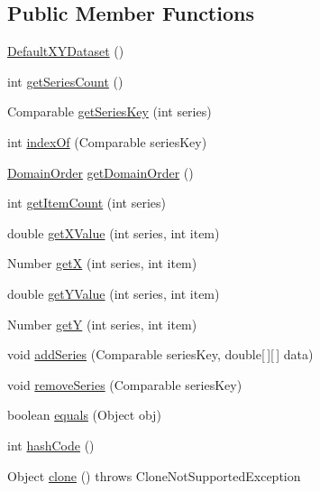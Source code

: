 \subsection*{Public Member Functions}
\begin{DoxyCompactItemize}
\item 
\mbox{\hyperlink{classorg_1_1jfree_1_1data_1_1xy_1_1_default_x_y_dataset_aeb6942f7255b4a3582d83688f1157e79}{Default\+X\+Y\+Dataset}} ()
\item 
int \mbox{\hyperlink{classorg_1_1jfree_1_1data_1_1xy_1_1_default_x_y_dataset_a0e11a4936eb729adf611cb44013abc5b}{get\+Series\+Count}} ()
\item 
Comparable \mbox{\hyperlink{classorg_1_1jfree_1_1data_1_1xy_1_1_default_x_y_dataset_a6dfb403ab13b08ab72e484c32c2583e6}{get\+Series\+Key}} (int series)
\item 
int \mbox{\hyperlink{classorg_1_1jfree_1_1data_1_1xy_1_1_default_x_y_dataset_a436e2b868c431a1d9bc4ce560749334c}{index\+Of}} (Comparable series\+Key)
\item 
\mbox{\hyperlink{classorg_1_1jfree_1_1data_1_1_domain_order}{Domain\+Order}} \mbox{\hyperlink{classorg_1_1jfree_1_1data_1_1xy_1_1_default_x_y_dataset_ae665218f6d5daa96f37e198265f72200}{get\+Domain\+Order}} ()
\item 
int \mbox{\hyperlink{classorg_1_1jfree_1_1data_1_1xy_1_1_default_x_y_dataset_acb92df806d4aa8e3b18283b6dbf05461}{get\+Item\+Count}} (int series)
\item 
double \mbox{\hyperlink{classorg_1_1jfree_1_1data_1_1xy_1_1_default_x_y_dataset_a8b2261dd2265af0d085c4889ae519521}{get\+X\+Value}} (int series, int item)
\item 
Number \mbox{\hyperlink{classorg_1_1jfree_1_1data_1_1xy_1_1_default_x_y_dataset_ab501c39779d3289533248c8c40a18c1d}{getX}} (int series, int item)
\item 
double \mbox{\hyperlink{classorg_1_1jfree_1_1data_1_1xy_1_1_default_x_y_dataset_a2ac3a1e3295eaa3aacb36b210926fbf4}{get\+Y\+Value}} (int series, int item)
\item 
Number \mbox{\hyperlink{classorg_1_1jfree_1_1data_1_1xy_1_1_default_x_y_dataset_a8ad15161967d0f527b5fa885ebc14bc6}{getY}} (int series, int item)
\item 
void \mbox{\hyperlink{classorg_1_1jfree_1_1data_1_1xy_1_1_default_x_y_dataset_ae5b45f2fa36fbb4a123e5f8cc79e9428}{add\+Series}} (Comparable series\+Key, double\mbox{[}$\,$\mbox{]}\mbox{[}$\,$\mbox{]} data)
\item 
void \mbox{\hyperlink{classorg_1_1jfree_1_1data_1_1xy_1_1_default_x_y_dataset_a16d3b763b0b7eafc0dfb41d19dc684c2}{remove\+Series}} (Comparable series\+Key)
\item 
boolean \mbox{\hyperlink{classorg_1_1jfree_1_1data_1_1xy_1_1_default_x_y_dataset_a052652bf9cfccae599debee96b44d9be}{equals}} (Object obj)
\item 
int \mbox{\hyperlink{classorg_1_1jfree_1_1data_1_1xy_1_1_default_x_y_dataset_afa686c5effe2f7eaebccc69e0845a563}{hash\+Code}} ()
\item 
Object \mbox{\hyperlink{classorg_1_1jfree_1_1data_1_1xy_1_1_default_x_y_dataset_a81d3c0d90cd6535b174c5f18d15d830d}{clone}} ()  throws Clone\+Not\+Supported\+Exception 
\end{DoxyCompactItemize}
